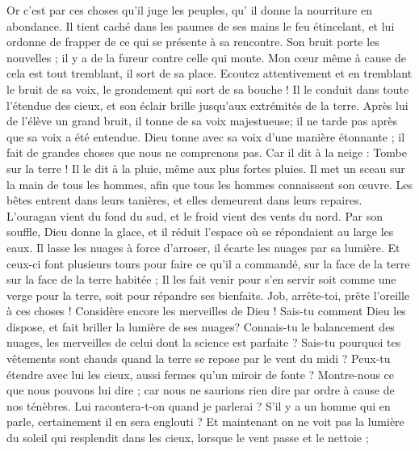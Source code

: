 \begin{multicols}{2}
{ Or c'est par ces choses qu'il juge les peuples, qu' il donne la nourriture en abondance.
 Il tient caché dans les paumes de ses mains le feu étincelant, et lui ordonne de frapper de ce qui se présente à sa rencontre.
 Son bruit porte les nouvelles ; il y a de la fureur contre celle qui monte.
\VerseOne{}Mon cœur même à cause de cela est tout tremblant, il sort de sa place.
Ecoutez attentivement et en tremblant le bruit de sa voix, le grondement qui sort de sa bouche !
Il le conduit dans toute l'étendue des cieux, et son éclair brille jusqu'aux extrémités de la terre.
Après lui de l'élève un grand bruit, il tonne de sa voix majestueuse; il ne tarde pas après que sa voix a été entendue.
Dieu tonne avec sa voix d'une manière étonnante ; il fait de grandes choses que nous ne comprenons pas.
Car il dit à la neige : Tombe sur la terre ! Il le dit à la pluie, même aux plus fortes pluies.
Il met un sceau sur la main de tous les hommes, afin que tous les hommes connaissent son œuvre.
Les bêtes entrent dans leurs tanières, et elles demeurent dans leurs repaires.
L'ouragan vient du fond du sud, et le froid vient des vents du nord.
Par son souffle, Dieu donne la glace, et il réduit l'espace où se répondaient au large les eaux.
Il lasse les nuages à force d'arroser, il écarte les nuages par sa lumière.
Et ceux-ci font plusieurs tours pour faire ce qu'il a commandé, sur la face de la terre sur la face de la terre habitée ;
Il les fait venir pour s'en servir soit comme une verge pour la terre, soit pour répandre ses bienfaits.
Job, arrête-toi, prête l'oreille à ces choses ! Considère encore les merveilles de Dieu !
Sais-tu comment Dieu les dispose, et fait briller la lumière de ses nuages?
Connais-tu le balancement des nuages, les merveilles de celui dont la science est parfaite ?
Sais-tu pourquoi tes vêtements sont chauds quand la terre se repose par le vent du midi ?
Peux-tu étendre avec lui les cieux, aussi fermes qu'un miroir de fonte ?
Montre-nous ce que nous pouvons lui dire ; car nous ne saurions rien dire par ordre à cause de nos ténèbres. 
Lui racontera-t-on quand je parlerai ? S'il y a un homme qui en parle, certainement il en sera englouti ?
Et maintenant on ne voit pas la lumière du soleil qui resplendit dans les cieux, lorsque le vent passe et le nettoie ;
}
\end{multicols}
